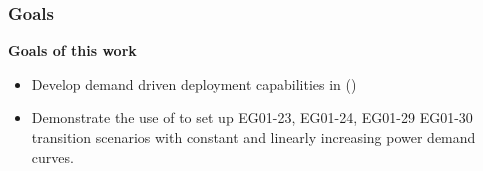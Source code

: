 \begin{frame}
    \frametitle{Goals}
    \textbf{Goals of this work} 
    \begin{itemize}
        \item Develop demand driven deployment capabilities in \Cyclus (\deploy)
        \item Demonstrate the use of \deploy to set up EG01-23, EG01-24, EG01-29
        EG01-30 transition scenarios with constant and linearly increasing 
        power demand curves. 
    \end{itemize}

\end{frame}